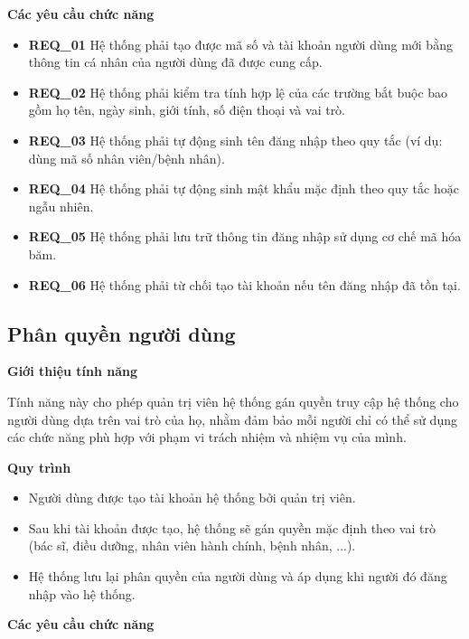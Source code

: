 \noindent \textbf{Các yêu cầu chức năng}

\begin{itemize}
    \item \textbf{REQ\_01} Hệ thống phải tạo được mã số và tài khoản người dùng mới bằng thông tin cá nhân của người dùng đã được cung cấp.
    \item \textbf{REQ\_02} Hệ thống phải kiểm tra tính hợp lệ của các trường bắt buộc bao gồm họ tên, ngày sinh, giới tính, số điện thoại và vai trò.
    \item \textbf{REQ\_03} Hệ thống phải tự động sinh tên đăng nhập theo quy tắc (ví dụ: dùng mã số nhân viên/bệnh nhân).
    \item \textbf{REQ\_04} Hệ thống phải tự động sinh mật khẩu mặc định theo quy tắc hoặc ngẫu nhiên.
    \item \textbf{REQ\_05} Hệ thống phải lưu trữ thông tin đăng nhập sử dụng cơ chế mã hóa băm.
    \item \textbf{REQ\_06} Hệ thống phải từ chối tạo tài khoản nếu tên đăng nhập đã tồn tại.
\end{itemize}

\subsection{Phân quyền người dùng}

\noindent \textbf{Giới thiệu tính năng}

Tính năng này cho phép quản trị viên hệ thống gán quyền truy cập hệ thống cho người dùng dựa trên vai trò của họ, nhằm đảm bảo mỗi người chỉ có thể sử dụng các chức năng phù hợp với phạm vi trách nhiệm và nhiệm vụ của mình.

\noindent \textbf{Quy trình}

\begin{itemize} 
    \item Người dùng được tạo tài khoản hệ thống bởi quản trị viên.

    \item Sau khi tài khoản được tạo, hệ thống sẽ gán quyền mặc định theo vai trò (bác sĩ, điều dưỡng, nhân viên hành chính, bệnh nhân, ...).

    \item Hệ thống lưu lại phân quyền của người dùng và áp dụng khi người đó đăng nhập vào hệ thống.
\end{itemize}

\noindent \textbf{Các yêu cầu chức năng}

